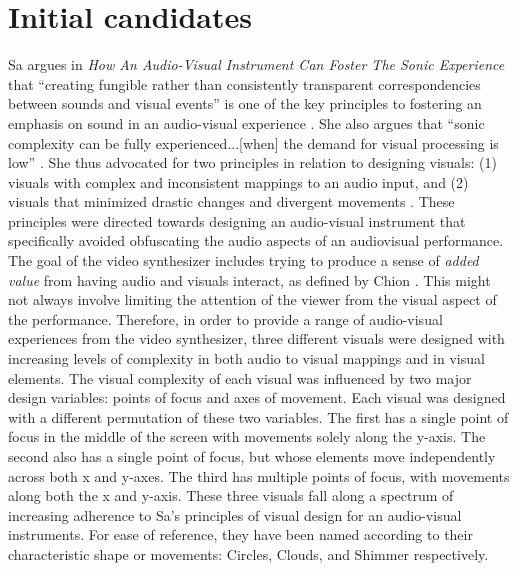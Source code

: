 \documentclass[../initial_thesis.tex]{subfiles}
\begin{document}
\section{Initial candidates} \label{sec:initialcandidates}
Sa argues in \textit{How An Audio-Visual Instrument Can Foster The Sonic Experience} that ``creating fungible rather than consistently transparent correspondencies between sounds and visual events'' is one of the key principles to fostering an emphasis on sound in an audio-visual experience \cite{Sa2013}. She also argues that ``sonic complexity can be fully experienced...[when] the demand for visual processing is low'' \cite{Sa2013}. She thus advocated for two principles in relation to designing visuals: (1) visuals with complex and inconsistent mappings to an audio input, and (2) visuals that minimized drastic changes and divergent movements \cite{Sa2013}. These principles were directed towards designing an audio-visual instrument that specifically avoided obfuscating the audio aspects of an audiovisual performance. The goal of the video synthesizer includes trying to produce a sense of \emph{added value} from having audio and visuals interact, as defined by Chion \cite{Chion1994}. This might not always involve limiting the attention of the viewer from the visual aspect of the performance. Therefore, in order to provide a range of audio-visual experiences from the video synthesizer, three different visuals were designed with increasing levels of complexity in both audio to visual mappings and in visual elements. The visual complexity of each visual was influenced by two major design variables: points of focus and axes of movement. Each visual was designed with a different permutation of these two variables. The first has a single point of focus in the middle of the screen with movements solely along the y-axis. The second also has a single point of focus, but whose elements move independently across both x and y-axes. The third has multiple points of focus, with movements along both the x and y-axis. These three visuals fall along a spectrum of increasing adherence to Sa's principles of visual design for an audio-visual instruments. For ease of reference, they have been named according to their characteristic shape or movements: Circles, Clouds, and Shimmer respectively.
\end{document}

